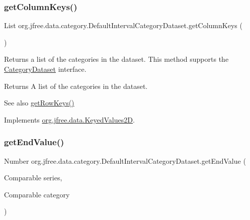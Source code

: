 \subsubsection{\texorpdfstring{get\+Column\+Keys()}{getColumnKeys()}}
{\footnotesize\ttfamily List org.\+jfree.\+data.\+category.\+Default\+Interval\+Category\+Dataset.\+get\+Column\+Keys (\begin{DoxyParamCaption}{ }\end{DoxyParamCaption})}

Returns a list of the categories in the dataset. This method supports the \mbox{\hyperlink{interfaceorg_1_1jfree_1_1data_1_1category_1_1_category_dataset}{Category\+Dataset}} interface.

\begin{DoxyReturn}{Returns}
A list of the categories in the dataset.
\end{DoxyReturn}
\begin{DoxySeeAlso}{See also}
\mbox{\hyperlink{classorg_1_1jfree_1_1data_1_1category_1_1_default_interval_category_dataset_aa8a0a871f4557e0ef292fe5e9db0d55b}{get\+Row\+Keys()}} 
\end{DoxySeeAlso}


Implements \mbox{\hyperlink{interfaceorg_1_1jfree_1_1data_1_1_keyed_values2_d_af6b8780fee7cccdb967fc0f199398615}{org.\+jfree.\+data.\+Keyed\+Values2D}}.

\mbox{\label{classorg_1_1jfree_1_1data_1_1category_1_1_default_interval_category_dataset_a6b536be218d6a7cafe97ef2d26c85c38}} 
\subsubsection{\texorpdfstring{get\+End\+Value()}{getEndValue()}\hspace{0.1cm}{\footnotesize\ttfamily [1/2]}}
{\footnotesize\ttfamily Number org.\+jfree.\+data.\+category.\+Default\+Interval\+Category\+Dataset.\+get\+End\+Value (\begin{DoxyParamCaption}\item[{Comparable}]{series,  }\item[{Comparable}]{category }\end{DoxyParamCaption})}

